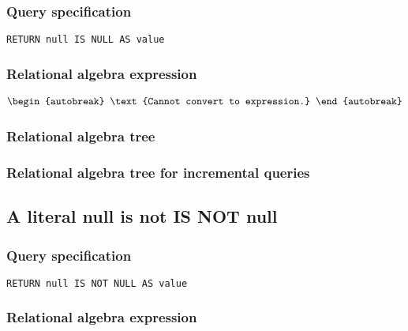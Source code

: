 \subsubsection*{Query specification}

\begin{lstlisting}
RETURN null IS NULL AS value
\end{lstlisting}

\subsubsection*{Relational algebra expression}

\begin{align*}
\begin{autobreak}
\text{Cannot convert to expression.}
\end{autobreak}
\end{align*}

\subsubsection*{Relational algebra tree}


\subsubsection*{Relational algebra tree for incremental queries}


\subsection{A literal null is not IS NOT null}

\subsubsection*{Query specification}

\begin{lstlisting}
RETURN null IS NOT NULL AS value
\end{lstlisting}

\subsubsection*{Relational algebra expression}


